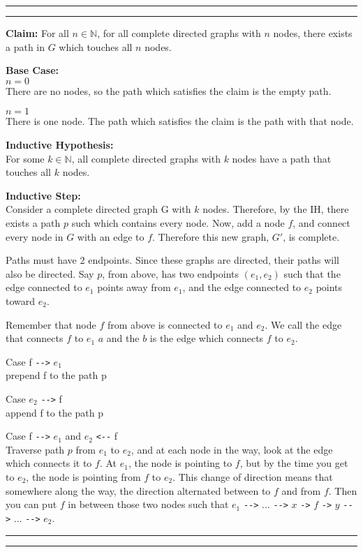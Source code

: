 \documentclass[11pt]{article}
\newcounter{questionCounter}
\newcounter{partCounter}[questionCounter]
\newenvironment{question}[2][\arabic{questionCounter}]{%
    \setcounter{partCounter}{0}%
    \vspace{.25in} \hrule \vspace{0.5em}%
        \noindent{\bf #2}%
    \vspace{0.8em} \hrule \vspace{.10in}%
    \addtocounter{questionCounter}{1}%
}{}
\begin{document}
\begin{question}{Pizzadeliv'ryman}
\textbf{Claim:} For all $n\in\mathbb{N}$, for all complete directed graphs with $n$ nodes, there exists a path 
in $G$ which touches all $n$ nodes.

\textbf{Base Case:}\\
$n=0$\\
There are no nodes, so the path which satisfies the claim is the empty path.

$n=1$\\
There is one node. The path which satisfies the claim is the path with that node.

\textbf{Inductive Hypothesis:}\\
For some $k\in\mathbb{N}$, all complete directed graphs with $k$ nodes have a path 
that touches all $k$ nodes.


\textbf{Inductive Step:}\\
Consider a complete directed graph G with $k$ nodes. Therefore, by the IH, there 
exists a path $p$ such which contains every node. Now, add a node $f$, and connect every
node in $G$ with an edge to $f$. Therefore this new graph, $G'$, is complete.

Paths must have 2 endpoints. Since these graphs are directed, their paths will
also be directed. Say $p$, from above, has two endpoints $(e_1,e_2)$ such that
the edge connected to $e_1$ points away from $e_1$, and the edge connected to $e_2$ 
points toward $e_2$.

Remember that node $f$ from above is connected to $e_1$ and $e_2$. We 
call the edge that connects $f$ to $e_1$ $a$ and the $b$ is the edge which 
connects $f$ to $e_2$.

Case f \verb|-->| $e_1$\\
prepend f to the path p

Case $e_2$ \verb|-->| f\\
append f to the path p

Case f \verb|-->| $e_1$ and $e_2$ \verb|<--| f\\
Traverse path $p$ from $e_1$ to $e_2$, and at each node in the way,
look at the edge which connects it to $f$. At $e_1$, the node is pointing
to $f$, but by the time you get to $e_2$, the node is pointing from $f$ to $e_2$.
This change of direction means that somewhere along the way, the direction 
alternated between to $f$ and from $f$. Then you can put $f$ in between those two
nodes such that $e_1$ \verb|-->| ... \verb|-->| $x$ \verb|->| $f$ \verb|->| $y$ \verb|-->| ... \verb|-->| $e_2$. 

\end{question}
\begin{question}{On the Run}
\end{question}
\end{document}
